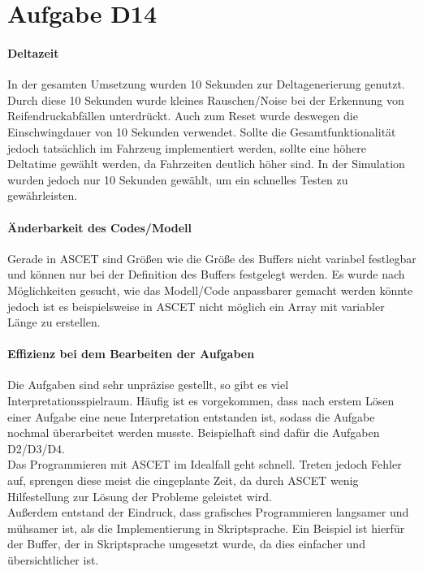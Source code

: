 \chapter{Aufgabe D14}
\subsubsection{Deltazeit}
In der gesamten Umsetzung wurden 10 Sekunden zur Deltagenerierung genutzt. Durch diese 10 Sekunden wurde kleines Rauschen/Noise bei der Erkennung von Reifendruckabfällen unterdrückt. Auch zum Reset wurde deswegen die Einschwingdauer von 10 Sekunden verwendet.
Sollte die Gesamtfunktionalität jedoch tatsächlich im Fahrzeug implementiert werden, sollte eine höhere Deltatime gewählt werden, da Fahrzeiten deutlich höher sind. In der Simulation wurden jedoch nur 10 Sekunden gewählt, um ein schnelles Testen zu gewährleisten.

\subsubsection{Änderbarkeit des Codes/Modell}
Gerade in ASCET sind Größen wie die Größe des Buffers nicht variabel festlegbar und können nur bei der Definition des Buffers festgelegt werden. Es wurde nach Möglichkeiten gesucht, wie das Modell/Code anpassbarer gemacht werden könnte jedoch ist es beispielsweise in ASCET nicht möglich ein Array mit variabler Länge zu erstellen. 

\subsubsection{Effizienz bei dem Bearbeiten der Aufgaben}
Die Aufgaben sind sehr unpräzise gestellt, so gibt es viel Interpretationsspielraum. Häufig ist es vorgekommen, dass nach erstem Lösen einer Aufgabe eine neue Interpretation entstanden ist, sodass die Aufgabe nochmal überarbeitet werden musste. Beispielhaft sind dafür die Aufgaben D2/D3/D4.\\
Das Programmieren mit ASCET im Idealfall geht schnell. Treten jedoch Fehler auf, sprengen diese meist die eingeplante Zeit, da durch ASCET wenig Hilfestellung zur Lösung der Probleme geleistet wird.\\
Außerdem entstand der Eindruck, dass grafisches Programmieren langsamer und mühsamer ist, als die Implementierung in Skriptsprache. Ein Beispiel ist hierfür der Buffer, der in Skriptsprache umgesetzt wurde, da dies einfacher und übersichtlicher ist.\\